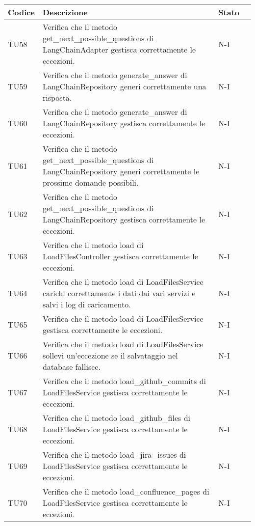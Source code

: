 \begin{table}[h!]
    \centering
    \renewcommand{\arraystretch}{1.5}
    \begin{tabularx}{\textwidth}{|p{}|X|p{}|p{}|}\hline
    \rowcolor[HTML]{FFD700}
    \textbf{Codice} & \textbf{Descrizione} & \textbf{Stato} \\ \hline
    TU58 & Verifica che il metodo get\_next\_possible\_questions di LangChainAdapter gestisca correttamente le eccezioni. &  N-I \\ \hline
    TU59 & Verifica che il metodo generate\_answer di LangChainRepository generi correttamente una risposta. &  N-I \\ \hline
    TU60 & Verifica che il metodo generate\_answer di LangChainRepository gestisca correttamente le eccezioni. &  N-I \\ \hline
    TU61 & Verifica che il metodo get\_next\_possible\_questions di LangChainRepository generi correttamente le prossime domande possibili. &  N-I \\ \hline
    TU62 & Verifica che il metodo get\_next\_possible\_questions di LangChainRepository gestisca correttamente le eccezioni. &  N-I \\ \hline
    TU63 & Verifica che il metodo load di LoadFilesController gestisca correttamente le eccezioni. &  N-I \\ \hline
    TU64 & Verifica che il metodo load di LoadFilesService carichi correttamente i dati dai vari servizi e salvi i log di caricamento. &  N-I \\ \hline
    TU65 & Verifica che il metodo load di LoadFilesService gestisca correttamente le eccezioni. &  N-I \\ \hline
    TU66 & Verifica che il metodo load di LoadFilesService sollevi un'eccezione se il salvataggio nel database fallisce. &  N-I \\ \hline
    TU67 & Verifica che il metodo load\_github\_commits di LoadFilesService gestisca correttamente le eccezioni. &  N-I \\ \hline
    TU68 & Verifica che il metodo load\_github\_files di LoadFilesService gestisca correttamente le eccezioni. &  N-I \\ \hline
    TU69 & Verifica che il metodo load\_jira\_issues di LoadFilesService gestisca correttamente le eccezioni. &  N-I \\ \hline
    TU70 & Verifica che il metodo load\_confluence\_pages di LoadFilesService gestisca correttamente le eccezioni. &  N-I \\ \hline

\end{tabularx}
\end{table}
